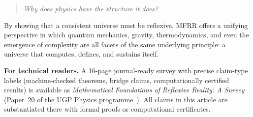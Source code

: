 \documentclass[11pt]{article}
\begin{document}
\begin{quote}
\emph{Why does physics have the structure it does?}
\end{quote}

By showing that a consistent universe must be reflexive, MFRR offers a unifying perspective in
which quantum mechanics, gravity, thermodynamics, and even the emergence of complexity are
all facets of the same underlying principle: a universe that computes, defines, and sustains
itself.

\medskip
\noindent\textbf{For technical readers.}
A 16-page journal-ready survey with precise claim-type labels (machine-checked theorems, bridge claims, computationally certified results) is available as \emph{Mathematical Foundations of Reflexive Reality: A Survey} (Paper~20 of the UGP Physics programme~\cite{SpivackResearchProgrammes}). All claims in this article are substantiated there with formal proofs or computational certificates.
\end{document}
